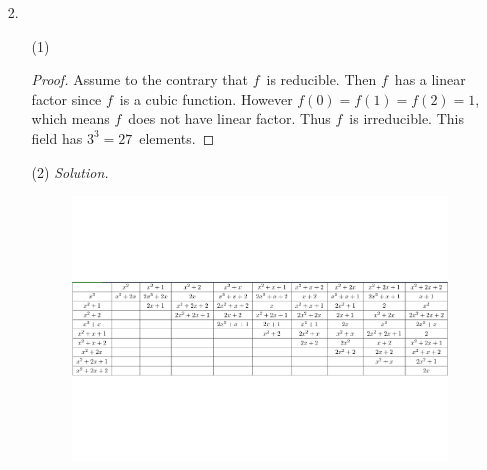 \documentclass[12pt]{article}
\begin{document}
\begin{enumerate}
\begin{enumerate}
\begin{proof}
		\end{proof}
	\end{enumerate}
	\item[2.]
	\begin{enumerate}
		\item[(1)]
		\begin{proof}
		    Assume to the contrary that $f$\ is reducible. Then $f$\ has a linear factor since $f$\ is a cubic function. However $f(0)=f(1)=f(2)=1$, which means $f$\ does not have linear factor. Thus $f$\ is irreducible. This field has $3^3=27$\ elements.
		\end{proof}
		\item[(2)]
		\textit{Solution.}
		\begin{figure}[H] 
		    \centering 
		    \includegraphics[width=1.1\textwidth]{table} 
    	\end{figure}
	\end{enumerate}

\end{enumerate}
\end{document}
